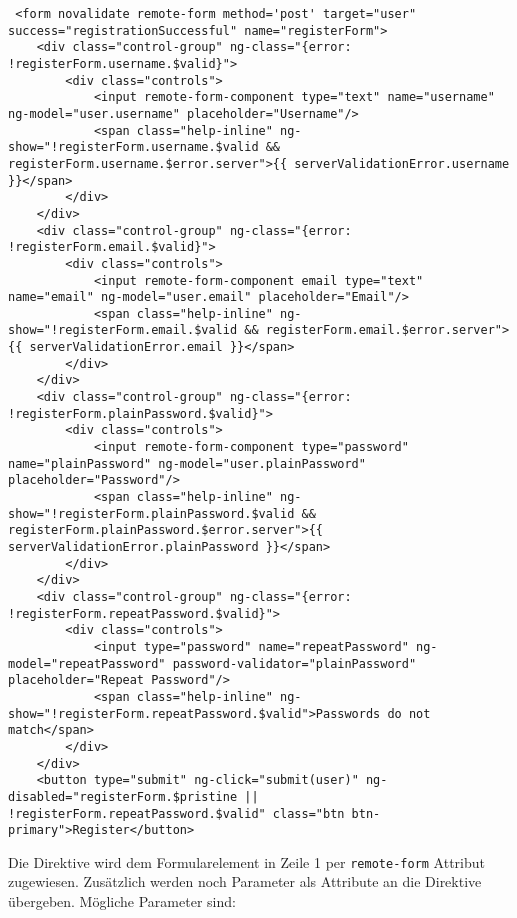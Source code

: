 \begin{lstlisting}
 <form novalidate remote-form method='post' target="user" success="registrationSuccessful" name="registerForm">
    <div class="control-group" ng-class="{error: !registerForm.username.$valid}">
        <div class="controls">
            <input remote-form-component type="text" name="username" ng-model="user.username" placeholder="Username"/>
            <span class="help-inline" ng-show="!registerForm.username.$valid && registerForm.username.$error.server">{{ serverValidationError.username }}</span>
        </div>
    </div>
    <div class="control-group" ng-class="{error: !registerForm.email.$valid}">
        <div class="controls">
            <input remote-form-component email type="text" name="email" ng-model="user.email" placeholder="Email"/>
            <span class="help-inline" ng-show="!registerForm.email.$valid && registerForm.email.$error.server">{{ serverValidationError.email }}</span>
        </div>
    </div>
    <div class="control-group" ng-class="{error: !registerForm.plainPassword.$valid}">
        <div class="controls">
            <input remote-form-component type="password" name="plainPassword" ng-model="user.plainPassword" placeholder="Password"/>
            <span class="help-inline" ng-show="!registerForm.plainPassword.$valid && registerForm.plainPassword.$error.server">{{ serverValidationError.plainPassword }}</span>
        </div>
    </div>
    <div class="control-group" ng-class="{error: !registerForm.repeatPassword.$valid}">
        <div class="controls">
            <input type="password" name="repeatPassword" ng-model="repeatPassword" password-validator="plainPassword" placeholder="Repeat Password"/>
            <span class="help-inline" ng-show="!registerForm.repeatPassword.$valid">Passwords do not match</span>
        </div>
    </div>
    <button type="submit" ng-click="submit(user)" ng-disabled="registerForm.$pristine || !registerForm.repeatPassword.$valid" class="btn btn-primary">Register</button>
\end{lstlisting}
Die Direktive wird dem Formularelement in Zeile 1 per \texttt{remote-form} Attribut zugewiesen. Zusätzlich werden noch Parameter als Attribute an die Direktive übergeben. Mögliche Parameter sind:
